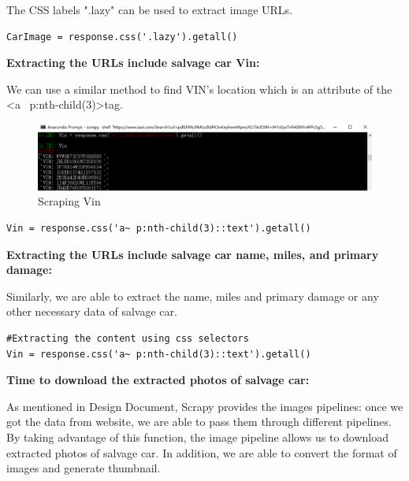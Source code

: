 \documentclass[onecolumn, draftclsnofoot,10pt, compsoc]{IEEEtran}
\begin{document}


The CSS labels ".lazy" can be used to extract image URLs. 
\begin{verbatim}
CarImage = response.css('.lazy').getall()
\end{verbatim}
\textbf{Extracting the URLs include salvage car Vin:}

We can use a similar method to find VIN's location which is an attribute of the \textless a~ p:nth-child(3)\textgreater  tag.

\begin{figure}[H]
\centering
\includegraphics[scale=0.65]{vinscrape}
\caption{Scraping Vin}
\label{fig:vin}
\end{figure}


\begin{verbatim}
Vin = response.css('a~ p:nth-child(3)::text').getall()
\end{verbatim}

\textbf{Extracting the URLs include salvage car name, miles, and primary damage:}

Similarly, we are able to extract the name, miles and primary damage or any other necessary data of salvage car.
\begin{verbatim}
#Extracting the content using css selectors
Vin = response.css('a~ p:nth-child(3)::text').getall()

\end{verbatim}

\textbf{Time to download the extracted photos of salvage car:}

As mentioned in Design Document, Scrapy provides the images pipelines: once we got the data from website, we are able to pass them through different pipelines. By taking advantage of this function, the image pipeline allows us to download extracted photos of salvage car. In addition, we are able to convert the format of images and generate thumbnail.
\end{document}
